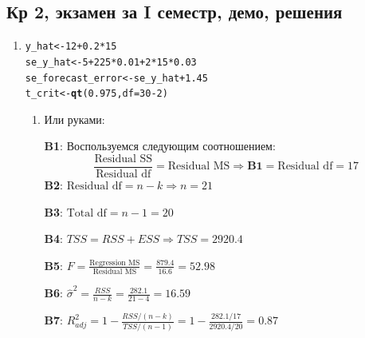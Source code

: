 \documentclass[12pt, a4paper]{article}\usepackage[]{graphicx}\usepackage[]{color}
\makeatletter
\newcommand{\hlnum}[1]{\textcolor[rgb]{0.686,0.059,0.569}{#1}}%
\newcommand{\hlopt}[1]{\textcolor[rgb]{0,0,0}{#1}}%
\newcommand{\hlstd}[1]{\textcolor[rgb]{0.345,0.345,0.345}{#1}}%
\newcommand{\hlkwb}[1]{\textcolor[rgb]{0.69,0.353,0.396}{#1}}%
\newcommand{\hlkwc}[1]{\textcolor[rgb]{0.333,0.667,0.333}{#1}}%
\newcommand{\hlkwd}[1]{\textcolor[rgb]{0.737,0.353,0.396}{\textbf{#1}}}%
\newenvironment{kframe}{%
 \def\at@end@of@kframe{}%
 \ifinner\ifhmode%
  \def\at@end@of@kframe{\end{minipage}}%
  \begin{minipage}{\columnwidth}%
 \fi\fi%
 \def\FrameCommand##1{\hskip\@totalleftmargin \hskip-\fboxsep
 \colorbox{shadecolor}{##1}\hskip-\fboxsep
     \hskip-\linewidth \hskip-\@totalleftmargin \hskip\columnwidth}%
 \MakeFramed {\advance\hsize-\width
   \@totalleftmargin\z@ \linewidth\hsize
   \@setminipage}}%
 {\par\unskip\endMakeFramed%
 \at@end@of@kframe}
\newenvironment{knitrout}{}{} %
\makeatother
\begin{document}
\subsection{Кр 2, экзамен за I семестр, демо, решения}

\begin{enumerate}

\item
\begin{knitrout}
\color{fgcolor}\begin{kframe}
\begin{alltt}
\hlstd{y_hat} \hlkwb{<-} \hlnum{12} \hlopt{+} \hlnum{0.2} \hlopt{*} \hlnum{15}
\hlstd{se_y_hat} \hlkwb{<-} \hlnum{5} \hlopt{+} \hlnum{225} \hlopt{*} \hlnum{0.01} \hlopt{+} \hlnum{2} \hlopt{*} \hlnum{15} \hlopt{*} \hlnum{0.03}
\hlstd{se_forecast_error} \hlkwb{<-} \hlstd{se_y_hat} \hlopt{+} \hlnum{1.45}
\hlstd{t_crit} \hlkwb{<-} \hlkwd{qt}\hlstd{(}\hlnum{0.975}\hlstd{,} \hlkwc{df} \hlstd{=} \hlnum{30} \hlopt{-} \hlnum{2}\hlstd{)}
\end{alltt}
\end{kframe}
\end{knitrout}

\begin{enumerate}
\item
Или руками:

\textbf{B1}: Воспользуемся следующим соотношением:
\[
\frac{\text{Residual SS}}{\text{Residual df}} = \text{Residual MS} \Rightarrow \textbf{B1} = \text{Residual df} = 17
\]
\textbf{B2}: $\text{Residual df} = n - k \Rightarrow n = 21$

\textbf{B3}: $\text{Total df} = n - 1 = 20$

\textbf{B4}: $TSS = RSS + ESS \Rightarrow TSS = 2920.4$

\textbf{B5}: $F = \frac{\text{Regression MS}}{\text{Residual MS}} = \frac{879.4}{16.6} = 52.98$

\textbf{B6}: $\hat{\sigma}^2 = \frac{RSS}{n-k} = \frac{282.1}{21-4} = 16.59$

\textbf{B7}: $R^2_{adj} = 1 - \frac{RSS/(n-k)}{TSS/(n-1)} = 1 - \frac{282.1/17}{2920.4/20} = 0.87$


\end{enumerate}
\end{enumerate}
\end{document}
